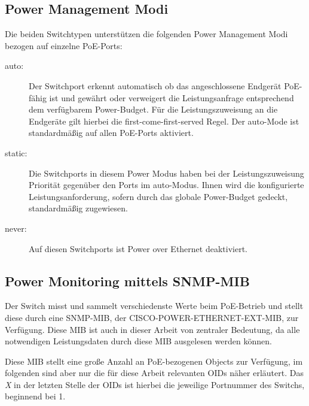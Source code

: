 \subsection{Power Management Modi}
\label{subsec:power-management-modes}
Die beiden Switchtypen unterst\"utzen die folgenden Power Management Modi bezogen auf einzelne PoE-Ports:
\begin{description}
\item [auto:] Der Switchport erkennt automatisch ob das angeschlossene Endger\"at PoE-f\"ahig ist und gew\"ahrt oder verweigert die Leistungsanfrage entsprechend dem verf\"ugbarem Power-Budget. F\"ur die Leistungszuweisung an die Endger\"ate gilt hierbei die first-come-first-served Regel. Der auto-Mode ist standardm\"a{\ss}ig auf allen PoE-Ports aktiviert.
\item [static:] Die Switchports in diesem Power Modus haben bei der Leistungszuweisung Priorit\"at gegen\"uber den Ports im auto-Modus. Ihnen wird die konfigurierte Leistungsanforderung, sofern durch das globale Power-Budget gedeckt, standardm\"a{\ss}ig zugewiesen.
\item [never:] Auf diesen Switchports ist Power over Ethernet deaktiviert. 
\end{description}

\subsection{Power Monitoring mittels SNMP-MIB}
Der Switch misst und sammelt verschiedenste Werte beim PoE-Betrieb und stellt diese durch eine SNMP-MIB, der CISCO-POWER-ETHERNET-EXT-MIB\cite{cisco-poe-ext-mib}, zur Verf\"ugung.
Diese MIB ist auch in dieser Arbeit von zentraler Bedeutung, da alle notwendigen Leistungsdaten durch diese MIB ausgelesen werden k\"onnen.

Diese MIB stellt eine gro{\ss}e Anzahl an PoE-bezogenen Objects zur Verf\"ugung, im folgenden sind aber nur die f\"ur diese Arbeit relevanten OIDs n\"aher erl\"autert. Das \textit{X} in der letzten Stelle der OIDs ist hierbei die jeweilige Portnummer des Switchs, beginnend bei 1.

